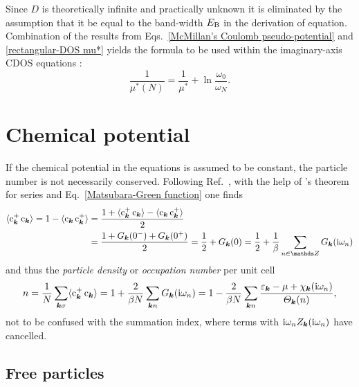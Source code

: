 Since $D$ is theoretically infinite and practically unknown it is eliminated by
the assumption that it be equal to the band-width $E \sb{\text{B}}$ in the derivation
of  equation. Combination of the results from
Eqs.~\ref{McMillan's Coulomb pseudo-potential} and \ref{rectangular-DOS mu*}
yields the formula to be used within the imaginary-axis CDOS 
equations \cite[Eq.~13]{AllenDynes75}:
%
\begin{equation} \label{CDOS rescaled Coulomb pseudo-potential}
    \frac 1 {\mu^*(N)} = \frac 1 {\mu^*} + \ln \frac{\omega_0}{\omega_N}.
\end{equation}

\section{Chemical potential}
\label{chemical potential}

If the chemical potential in the  equations is assumed to be
constant, the particle number is not necessarily conserved. Following
Ref.~, with the help of
's theorem for  series and
Eq.~\ref{Matsubara-Green function} one finds
%
\begin{align*}
    \av{\op c_{\vec k}^+ \, \op c_{\vec k}}
    = 1 - \av{\op c_{\vec k} \, \op c_{\vec k}^+}
    &= \frac { 1
        + \av{\op c_{\vec k}^+ \, \op c_{\vec k}}
        - \av{\op c_{\vec k} \, \op c_{\vec k}^+}
        } 2
    \\
    &= \frac {1 + G_{\vec k}(0^-) + G_{\vec k}(0^+)} 2
    = \frac 1 2 + G_{\vec k}(0)
    = \frac 1 2 + \frac 1 \beta \sum_{n \in \mathds Z} G_{\vec k}(\I \omega_n)
\end{align*}
%
and thus the \emph{particle density} or \emph{occupation number} per unit cell
%
\begin{equation*}
    n = \frac 1 N \sum_{\boldsymbol k \sigma} \langle\mathrm c_{\boldsymbol k}^+ \, \mathrm c_{\boldsymbol k}\rangle
    = 1 + \frac 2 {\beta N} \sum_{\boldsymbol k n} G_{\boldsymbol k}(\mathrm i \omega_n)
    = 1 - \frac 2 {\beta N} \sum_{\boldsymbol k n} \frac
        {\varepsilon_{\boldsymbol k} - \mu + \chi_{\boldsymbol k}(\mathrm i \omega_n)}
        {\varTheta_{\boldsymbol k}(n)},
\end{equation*}
%
not to be confused with the summation index, where terms with $\mathrm i \omega_n
Z_{\boldsymbol k}(\mathrm i \omega_n)$ have cancelled.

\subsection{Free particles}


